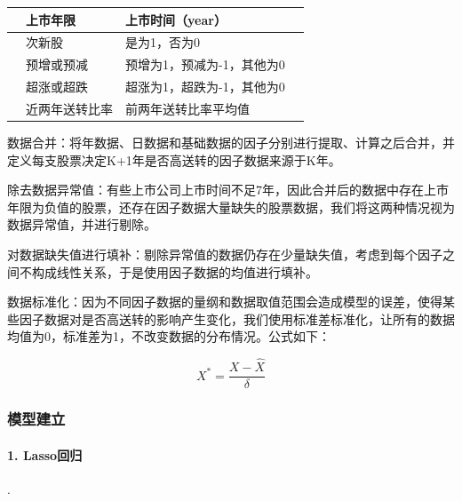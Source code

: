 \documentclass[lang=cn,12pt]{elegantpaper}
\begin{document}
\begin{center}
\begin{tabular}{|l|l|l|l|}
			& 上市年限                                                                & 上市时间（year）                                                       \\ \hline
			& 次新股                                                                 & 是为1，否为0                                                           \\ \hline
			& 预增或预减                                                               & 预增为1，预减为-1，其他为0                                                      \\ \hline
			& 超涨或超跌                                                               & 超涨为1，超跌为-1，其他为0                                                      \\ \hline
			& 近两年送转比率                                                             & 前两年送转比率平均值                                                         \\ \hline
		\end{tabular}
\end{center}

数据合并：将年数据、日数据和基础数据的因子分别进行提取、计算之后合并，并定义每支股票决定K+1年是否高送转的因子数据来源于K年。

除去数据异常值：有些上市公司上市时间不足7年，因此合并后的数据中存在上市年限为负值的股票，还存在因子数据大量缺失的股票数据，我们将这两种情况视为数据异常值，并进行剔除。

对数据缺失值进行填补：剔除异常值的数据仍存在少量缺失值，考虑到每个因子之间不构成线性关系，于是使用因子数据的均值进行填补。

数据标准化：因为不同因子数据的量纲和数据取值范围会造成模型的误差，使得某些因子数据对是否高送转的影响产生变化，我们使用标准差标准化，让所有的数据均值为0，标准差为1，不改变数据的分布情况。公式如下：

\begin{equation}
\nonumber X^*=\frac{X-\hat{X}}{\delta}
\end{equation}

\subsubsection{模型建立}

\paragraph{1. Lasso回归}.
\end{document}
